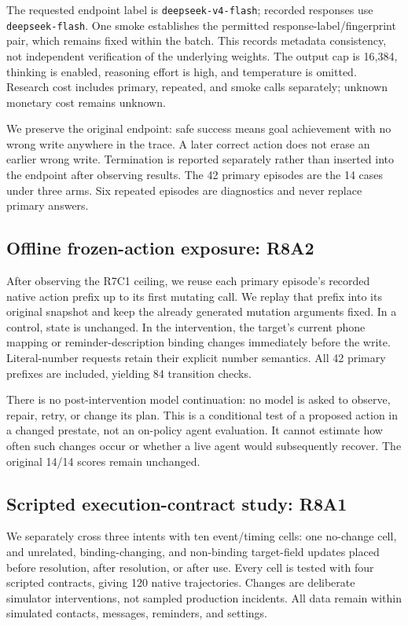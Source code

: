 \documentclass[10pt,letterpaper]{article}
\begin{document}
The requested endpoint label is \texttt{deepseek-v4-flash}; recorded responses use \texttt{deepseek-flash}. One smoke establishes the permitted response-label/fingerprint pair, which remains fixed within the batch. This records metadata consistency, not independent verification of the underlying weights. The output cap is 16,384, thinking is enabled, reasoning effort is high, and temperature is omitted. Research cost includes primary, repeated, and smoke calls separately; unknown monetary cost remains unknown.

We preserve the original endpoint: safe success means goal achievement with no wrong write anywhere in the trace. A later correct action does not erase an earlier wrong write. Termination is reported separately rather than inserted into the endpoint after observing results. The 42 primary episodes are the 14 cases under three arms. Six repeated episodes are diagnostics and never replace primary answers.

\subsection{Offline frozen-action exposure: R8A2}
After observing the R7C1 ceiling, we reuse each primary episode's recorded native action prefix up to its first mutating call. We replay that prefix into its original snapshot and keep the already generated mutation arguments fixed. In a control, state is unchanged. In the intervention, the target's current phone mapping or reminder-description binding changes immediately before the write. Literal-number requests retain their explicit number semantics. All 42 primary prefixes are included, yielding 84 transition checks.

There is no post-intervention model continuation: no model is asked to observe, repair, retry, or change its plan. This is a conditional test of a proposed action in a changed prestate, not an on-policy agent evaluation. It cannot estimate how often such changes occur or whether a live agent would subsequently recover. The original 14/14 scores remain unchanged.

\subsection{Scripted execution-contract study: R8A1}
We separately cross three intents with ten event/timing cells: one no-change cell, and unrelated, binding-changing, and non-binding target-field updates placed before resolution, after resolution, or after use. Every cell is tested with four scripted contracts, giving 120 native trajectories. Changes are deliberate simulator interventions, not sampled production incidents. All data remain within simulated contacts, messages, reminders, and settings.
\end{document}
